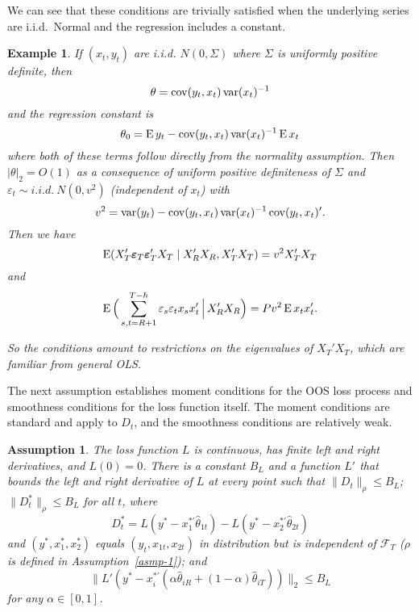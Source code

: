 \documentclass[11pt]{article}
\newcommand{\e}{\varepsilon}
\newtheorem{asmp}{Assumption}
\newtheorem{example}{Example}
\begin{document}
We can see that these conditions are trivially satisfied when the
underlying series are i.i.d.\ Normal and the regression includes a
constant.
\begin{example}
  If $(x_{t}, y_t)$ are i.i.d. $N(0, \Sigma)$ where $\Sigma$ is
  uniformly positive definite, then
  \begin{equation*}
    \theta = \operatorname{cov}(y_t, x_t) \operatorname{var}(x_t)^{-1}
  \end{equation*}
  and the regression constant is
  \begin{equation*}
    \theta_0 = \operatorname{E} y_t - \operatorname{cov}(y_t, x_t) \operatorname{var}(x_t)^{-1} \operatorname{E} x_t
  \end{equation*}
  where both of these terms follow directly from the normality
  assumption.  Then $|\theta|_2 = O(1)$ as a consequence of uniform
  positive definiteness of $\Sigma$ and $\varepsilon_t \sim i.i.d.\
  N(0, v^2)$ (independent of $x_t$) with
  \begin{equation*}
    v^2 = \operatorname{var}(y_t) - \operatorname{cov}(y_t, x_t) \operatorname{var}(x_t)^{-1} \operatorname{cov}(y_t, x_t)'.
  \end{equation*}
  Then we have
  \begin{equation*}
    \operatorname{E}(X_{T}'\boldsymbol{\varepsilon}_{T}\boldsymbol{\varepsilon}_{T}'X_T \mid X_{R}'X_{R}, X_{T}'X_{T})
    = v^2 X_{T}'X_{T}
  \end{equation*}
  and
  \begin{equation*}
    \E\Big( \sum_{s,t=R+1}^{T-h} \e_s \e_t x_s x_t'
    \,\Big|\, X_{R}'X_{R} \Big) = P v^2 \E x_t x_t'.
  \end{equation*}

  So the conditions amount to restrictions on the eigenvalues of
  $X_T'X_T$, which are familiar from general OLS.
\end{example}

The next assumption establishes moment conditions for the OOS loss
process and smoothness conditions for the loss function itself. The
moment conditions are standard and apply to $D_t$, and the smoothness
conditions are relatively weak.

\begin{asmp}\label{asmp-3}
  The loss function $L$ is continuous, has finite left and right
  derivatives, and $L(0) = 0$.  There is a constant $B_L$ and a
  function $L'$ that bounds the left and right derivative of $L$ at
  every point such that $\|D_t\|_\rho \leq B_L$; $\|D_t^*\|_\rho \leq
  B_L$ for all $t$, where
  \begin{equation*}
    D_t^* = L(y^* - x_1^{*\prime}\hat\theta_{1t})
    - L(y^* - x_2^{*\prime}\hat\theta_{2t})
  \end{equation*}
  and $(y^*, x_1^*, x_2^*)$ equals $(y_t, x_{1t}, x_{2t})$ in
  distribution but is independent of $\mathcal{F}_T$ ($\rho$ is defined
  in Assumption~\ref{asmp-1}); and
  \begin{equation*}
    \| L'(y^* - x_{i}^{*\prime}
    (\alpha \hat{\theta}_{iR} + (1-\alpha) \hat{\theta}_{iT})) \|_2
    \leq B_L
  \end{equation*}
  for any $\alpha \in [0,1]$.
\end{asmp}
\end{document}
